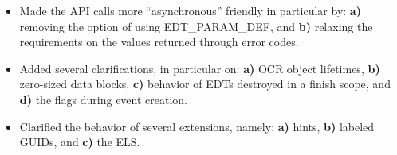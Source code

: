\begin{description}
\begin{itemize}
\item{Made the API calls more ``asynchronous'' friendly in particular by: {\bf a)} removing the
option of using EDT\_PARAM\_DEF, and {\bf b)} relaxing the requirements on the values returned
through error codes.}
\item{Added several clarifications, in particular on: {\bf a)} OCR object lifetimes,
{\bf b)} zero-sized data blocks, {\bf c)} behavior of EDTs destroyed in a finish scope, and
{\bf d)} the flags during event creation.}
\item{Clarified the behavior of several extensions, namely: {\bf a)} hints, {\bf b)} labeled GUIDs,
and {\bf c)} the ELS.}
\end{itemize}
\end{description}

